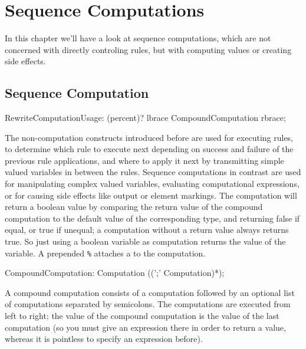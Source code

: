 \chapter{Sequence Computations}

In this chapter we'll have a look at sequence computations, which are not concerned with directly controling rules, but with computing values or creating side effects.

\section{Sequence Computation} \label{sec:seqcomp}

\begin{rail} 
  RewriteComputationUsage: (percent)? lbrace CompoundComputation rbrace; 
\end{rail}

The non-computation constructs introduced before are used for executing rules, to determine which rule to execute next depending on success and failure of the previous rule applications, and where to apply it next by transmitting simple valued variables in between the rules.
Sequence computations in contrast are used for manipulating complex valued variables, evaluating computational expressions, or for causing side effects like output or element markings.
The computation will return a boolean value by comparing the return value of the compound computation to the default value of the corresponding type, and returning false if equal, or true if unequal; a computation without a return value always returns true.
So just using a boolean variable as computation returns the value of the variable.
A prepended \texttt{\%} attaches a  to the computation.

\begin{rail} 
  CompoundComputation: Computation ((';' Computation)*); 
\end{rail}

A compound computation consists of a computation followed by an optional list of computations separated by semicolons.
The computations are executed from left to right;
the value of the compound computation is the value of the last computation (so you must give an expression there in order to return a value, whereas it is pointless to specify an expression before).

